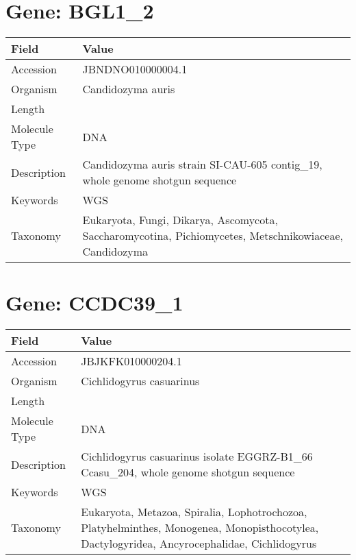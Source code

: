 \documentclass[10pt]{article}
\begin{document}
\section*{Gene: BGL1\_2}
{\footnotesize
\begin{longtable}{>{\raggedright\arraybackslash}p{4.5cm} >{\raggedright\arraybackslash}p{11.5cm}}
\textbf{Field} & \textbf{Value} \\
\hline
Accession & JBNDNO010000004.1 \\
Organism & Candidozyma auris \\
Length & 779708 \\
Molecule Type & DNA \\
Description & Candidozyma auris strain SI-CAU-605 contig\_19, whole genome shotgun sequence \\
Keywords & WGS \\
Taxonomy & Eukaryota, Fungi, Dikarya, Ascomycota, Saccharomycotina, Pichiomycetes, Metschnikowiaceae, Candidozyma \\
\end{longtable}
}


\section*{Gene: CCDC39\_1}
{\footnotesize
\begin{longtable}{>{\raggedright\arraybackslash}p{4.5cm} >{\raggedright\arraybackslash}p{11.5cm}}
\textbf{Field} & \textbf{Value} \\
\hline
Accession & JBJKFK010000204.1 \\
Organism & Cichlidogyrus casuarinus \\
Length & 37423 \\
Molecule Type & DNA \\
Description & Cichlidogyrus casuarinus isolate EGGRZ-B1\_66 Ccasu\_204, whole genome shotgun sequence \\
Keywords & WGS \\
Taxonomy & Eukaryota, Metazoa, Spiralia, Lophotrochozoa, Platyhelminthes, Monogenea, Monopisthocotylea, Dactylogyridea, Ancyrocephalidae, Cichlidogyrus \\
\end{longtable}
}
\end{document}
